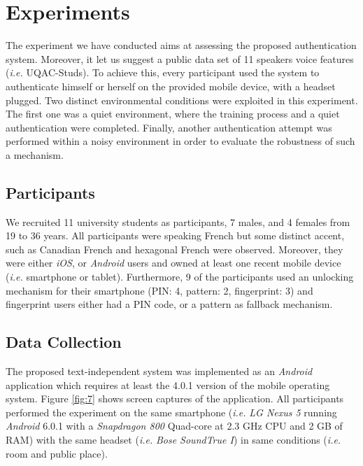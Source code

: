 \documentclass[cryptography,article,submit,moreauthors,pdftex,10pt,a4paper]{mdpi}
\begin{document}
\section{Experiments}

The experiment we have conducted aims at assessing the proposed authentication system. Moreover, it let us suggest a public data set of 11 speakers voice features (\textit{i.e.} UQAC-Studs). To achieve this, every participant used the system to authenticate himself or herself on the provided mobile device, with a headset plugged. Two distinct environmental conditions were exploited in this experiment. The first one was a quiet environment, where the training process and a quiet authentication were completed. Finally, another authentication attempt was performed within a noisy environment in order to evaluate the robustness of such a mechanism.

\subsection{Participants}

We recruited 11 university students as participants, 7 males, and 4 females from 19 to 36 years. All participants were speaking French but some distinct accent, such as Canadian French and hexagonal French were observed. Moreover, they were either \textit{iOS}, or \textit{Android} users and owned at least one recent mobile device (\textit{i.e.} smartphone or tablet). Furthermore, 9 of the participants used an unlocking mechanism for their smartphone (PIN: 4, pattern: 2, fingerprint: 3) and fingerprint users either had a PIN code, or a pattern as fallback mechanism.

\subsection{Data Collection}

The proposed text-independent system was implemented as an \textit{Android} application which requires at least the 4.0.1 version of the mobile operating system. Figure \ref{fig:7} shows screen captures of the application. All participants performed the experiment on the same smartphone (\textit{i.e.} \textit{LG Nexus 5} running \textit{Android} 6.0.1 with a \textit{Snapdragon 800} Quad-core at 2.3 GHz CPU and 2 GB of RAM) with the same headset (\textit{i.e.} \textit{Bose SoundTrue I}) in same conditions (\textit{i.e.} room and public place).
\end{document}
